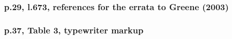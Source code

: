 \documentclass[12pt,english]{scrartcl}
\begin{document}
\subsubsection{p.29, l.673, references for the errata to Greene (2003)}

\subsubsection{p.37, Table 3, typewriter markup}
\end{document}
